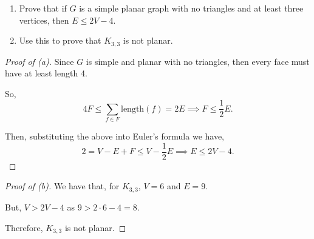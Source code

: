 \documentclass[../hw7]{subfiles}
\begin{document}
\begin{problem}
\begin{enumerate}
	\item Prove that if $G$ is a simple planar graph with no triangles and at least three vertices, then $E \le 2V-4$.
	\item Use this to prove that $K_{3,3}$ is not planar.
\end{enumerate}
\end{problem}
\begin{proof}[Proof of (a)]
	Since $G$  is simple and planar with no triangles, then every face must have at least length 4.

	So, \[
		4F \le \sum_{f\in F} \text{length}{(f)} = 2E \implies F \le \frac{1}{2}E
		.\]

	Then, substituting the above into Euler's formula we have, \[
		2=V-E+F \le V-\frac{1}{2}E \implies E \le 2V-4
		.\]
\end{proof}
\begin{proof}[Proof of (b)]
	We have that, for $K_{3,3}$, $V=6$ and $E=9$.

	But, $V>2V-4$ as  $9>2\cdot 6 - 4 = 8$.

	Therefore, $K_{3,3}$ is not planar.
\end{proof}
\end{document}
